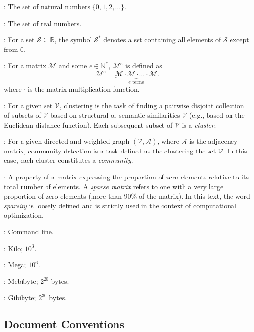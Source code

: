 \documentclass[a4paper,12pt]{extarticle}
\begin{document}
  \begin{description}[leftmargin=1.2em]
    \item[\(\mathbb{N}\)]: The set of natural numbers \(\{ 0, 1, 2, \dots  \}\).
    \item[\(\mathbb{R}\)]: The set of real numbers.
    \item[\(\mathscr{S}^*\)]: For a set \(\mathscr{S} \subseteq \mathbb{R}\), the symbol \(\mathscr{S}^*\) denotes a set containing all elements of \(\mathscr{S}\) except from \(0\).
    \item[\(\mathcal{M}^e\)]: For a matrix \(\mathcal{M}\) and some \(e \in \mathbb{N}^*\), \(\mathcal{M}^e\) is defined as
    \[
      \mathcal{M}^e = \underbrace{\mathcal{M} \cdot \mathcal{M} \cdot \hdots \cdot \mathcal{M}}_{e \text{ terms}} .
    \]
    where \(\cdot\) is the matrix multiplication function.
    \item[Clustering]: For a given set \(\mathscr{V}\), clustering is the task of finding a pairwise disjoint collection of subsets of \(\mathscr{V}\) based on structural or semantic similarities \(\mathscr{V}\) (e.g., based on the Euclidean distance function). Each subsequent subset of \(\mathscr{V}\) is a \textit{cluster}.
    \item[Community Detection]: For a given directed and weighted graph \( (\mathscr{V}, \mathcal{A}) \), where \( \mathcal{A} \) is the adjacency matrix, community detection is a task defined as the clustering the set \(\mathscr{V}\). In this case, each cluster constitutes a \textit{community}.
    \item[Sparsity]: A property of a matrix expressing the proportion of zero elements relative to its total number of elements. A \textit{sparse matrix} refers to one with a very large proportion of zero elements (more than 90\% of the matrix). In this text, the word \textit{sparsity} is loosely defined and is strictly used in the context of computational optimization.
    \item[CLI]: Command line.
    \item[K]: Kilo; \(10^3\).
    \item[M]: Mega; \(10^6\).
    \item[MiB]: Mebibyte; \(2^{20}\) bytes.
    \item[GiB]: Gibibyte; \(2^{30}\) bytes.
  \end{description}

  
  \subsection*{%
    \centering Document Conventions
  }
\end{document}
